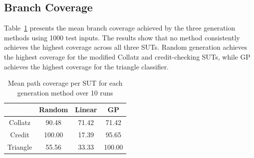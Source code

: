 \documentclass[runningheads]{llncs}
\begin{document}
\subsection{Branch Coverage}\label{sub:path}
Table~\ref{tab:coverage_results} presents the mean branch coverage achieved by the three generation methods using 1000 test inputs. The results show that no method consistently achieves the highest coverage across all three SUTs. Random generation achieves the highest coverage for the modified Collatz and credit-checking SUTs, while GP achieves the highest coverage for the triangle classifier.


\begin{table}[!htb]
    \centering\caption{Mean path coverage per SUT for each generation method over 10 runs}
    \label{tab:coverage_results}
    \begin{tabular}{|c|c|c|c|}
        \hline
                    & Random    & Linear    & GP        \\
        \hline
        Collatz     & 90.48     & 71.42     & 71.42     \\
        Credit      & 100.00    & 17.39     & 95.65     \\
        Triangle    & 55.56     & 33.33     & 100.00    \\
        \hline
    \end{tabular}
    
\end{table}
\end{document}
